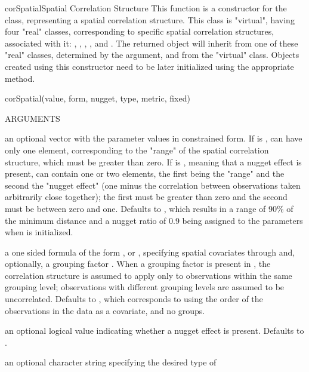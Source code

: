 \documentclass[pdftex]{article} \usepackage{url,graphicx}
\renewcommand{\Twiddle}{\mbox{\(\sim\)}}
\begin{document}
\begin{Helpfile}{corSpatial}{Spatial Correlation Structure}
  This function is a constructor for the  class,
  representing a spatial correlation structure. This class is
  "virtual", having four "real" classes, corresponding to specific
  spatial correlation structures, associated with it: ,
  , , , and . The
  returned object will inherit from one of these "real" classes,
  determined by the  argument, and from the "virtual"
   class. Objects created using this constructor need
  to be later initialized using the appropriate 
  method.
\begin{Example}
corSpatial(value, form, nugget, type, metric, fixed)
\end{Example}
\begin{Argument}{ARGUMENTS}
\item[\Co{value:}] an optional vector with the parameter values in
  constrained form. If  is ,  can have
  only one element, corresponding to the "range" of the spatial
  correlation structure, which must be greater than zero. If
   is , meaning that a nugget effect is present,
   can contain one or two elements, the first being the
  "range" and the second the "nugget effect" (one minus the
  correlation between observations taken arbitrarily close together);
  the first must be greater than zero and the second must be between
  zero and one. Defaults to , which results in a range
  of 90\% of the minimum distance and a nugget ratio of 0.9 being
  assigned to the parameters when  is initialized.
\item[\Co{form:}]
a one sided formula of the form \Co{{\Twiddle} S1+...+Sp}, or
\Co{{\Twiddle} S1+...+Sp | g}, specifying spatial covariates 
through  and,  optionally, a grouping factor . 
When a grouping factor is present in , the correlation
structure is assumed to apply only to observations within the same
grouping level; observations with different grouping levels are
assumed to be uncorrelated. Defaults to \Co{{\Twiddle} 1}, which corresponds
to using the order of the observations in the data as a covariate,
and no groups.
\item[\Co{nugget:}]
an optional logical value indicating whether a nugget
effect is present. Defaults to .
\item[\Co{type:}]
an optional character string specifying the desired type of

\end{Argument}
\end{Helpfile}
\end{document}
